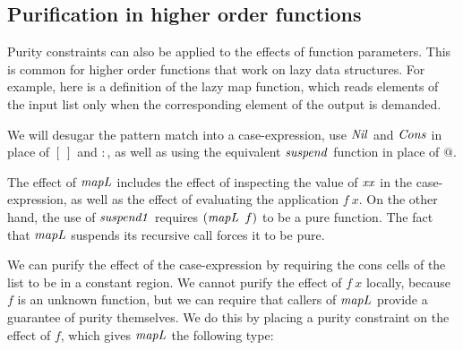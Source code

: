 \subsection{Purification in higher order functions}
\label{System:Effects:purification-higher-order}

Purity constraints can also be applied to the effects of function parameters. This is common for higher order functions that work on lazy data structures. For example, here is a definition of the lazy map function, which reads elements of the input list only when the corresponding element of the output is demanded.


We will desugar the pattern match into a case-expression, use $\operatorname{\mathit{Nil}}$ and $\operatorname{\mathit{Cons}}$ in place of $[~]$ and $:$, as well as using the equivalent $\operatorname{\mathit{suspend}}$ function in place of $@$.




The effect of $\operatorname{\mathit{mapL}}$ includes the effect of inspecting the value of $\operatorname{\mathit{xx}}$ in the case-expression, as well as the effect of evaluating the application $f \ x$. On the other hand, the use of $\operatorname{\mathit{suspend1}}$ requires $(\operatorname{\mathit{mapL}} \ f)$ to be a pure function. The fact that $\operatorname{\mathit{mapL}}$ suspends its recursive call forces it to be pure. 

We can purify the effect of the case-expression by requiring the cons cells of the list to be in a constant region. We cannot purify the effect of $f \ x$ locally, because $f$ is an unknown function, but we can require that callers of $\operatorname{\mathit{mapL}}$ provide a guarantee of purity themselves. We do this by placing a purity constraint on the effect of $f$, which gives $\operatorname{\mathit{mapL}}$ the following type:


